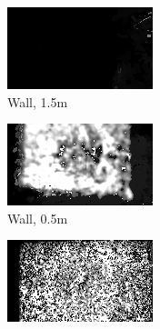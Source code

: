\begin{figure}[h!tb]
    \begin{subfigure}[b]{0.25\textwidth}
        \centering
        \includegraphics[width=0.9\linewidth]{images/materials/wall-far-conf}
        \caption{Wall, 1.5m}
        \label{fig:material-wall-far}
    \end{subfigure}%
    \begin{subfigure}[b]{0.25\textwidth}
        \centering
        \includegraphics[width=0.9\linewidth]{images/materials/wall-close-conf}
        \caption{Wall, 0.5m}
        \label{fig:material-wall-close}
    \end{subfigure}%
    \begin{subfigure}[b]{0.25\textwidth}
        \centering
        \includegraphics[width=0.9\linewidth]{images/materials/carpet-conf}

\end{subfigure}
\end{figure}
